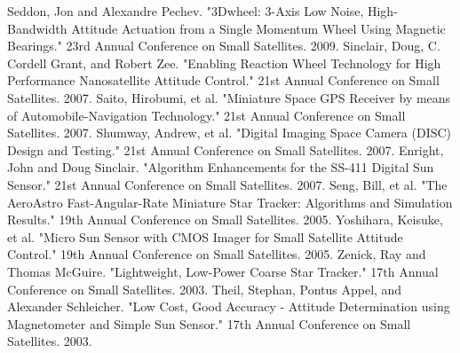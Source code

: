 \begin{thebibliography}{99}
 Seddon, Jon and Alexandre Pechev. "3Dwheel: 3-Axis Low Noise, High-Bandwidth Attitude Actuation from a Single Momentum Wheel Using Magnetic Bearings." 23rd Annual Conference on Small Satellites. 2009.
 Sinclair, Doug, C. Cordell Grant, and Robert Zee. "Enabling Reaction Wheel Technology for High Performance Nanosatellite Attitude Control." 21st Annual Conference on Small Satellites. 2007.
 Saito, Hirobumi, et al. "Miniature Space GPS Receiver by means of Automobile-Navigation Technology." 21st Annual Conference on Small Satellites. 2007.
 Shumway, Andrew, et al. "Digital Imaging Space Camera (DISC) Design and Testing." 21st Annual Conference on Small Satellites. 2007.
 Enright, John and Doug Sinclair. "Algorithm Enhancements for the SS-411 Digital Sun Sensor." 21st Annual Conference on Small Satellites. 2007.
 Seng, Bill, et al. "The AeroAstro Fast-Angular-Rate Miniature Star Tracker: Algorithms and Simulation Results." 19th Annual Conference on Small Satellites. 2005.
 Yoshihara, Keisuke, et al. "Micro Sun Sensor with CMOS Imager for Small Satellite Attitude Control." 19th Annual Conference on Small Satellites. 2005.
 Zenick, Ray and Thomas McGuire. "Lightweight, Low-Power Coarse Star Tracker." 17th Annual Conference on Small Satellites. 2003.
 Theil, Stephan, Pontus Appel, and Alexander Schleicher. "Low Cost, Good Accuracy - Attitude Determination using Magnetometer and Simple Sun Sensor." 17th Annual Conference on Small Satellites. 2003.
\end{thebibliography}
%